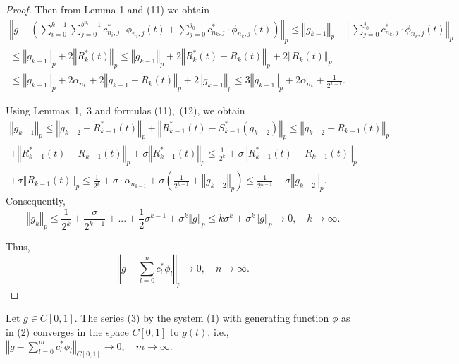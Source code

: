 \documentclass[
11pt,%
tightenlines,%
twoside,%
onecolumn,%
nofloats,%
nobibnotes,%
nofootinbib,%
superscriptaddress,%
noshowpacs,%
centertags]%
{revtex4}
\begin{document}
\begin{proof}
Then from Lemma 1 and (11) we obtain
\begin{multline*}
    \left\Vert  g- \left(  \sum_{i=0}^{k-1} \sum_{j=0}^{b^{n_i}-1}
    c_{n_i,j}^{\ast} \cdot \phi_{n_i,j}(t) + \sum_{j=0}^{j_0}
    c_{n_k,j}^{\ast} \cdot \phi_{n_k,j}(t)   \right)  \right\Vert_p
    \le \left\Vert  g_{k-1} \right\Vert_p +\left\Vert \sum_{j=0}^{j_0}
    c_{n_k,j}^{\ast} \cdot \phi_{n_k,j}(t) \right\Vert_p
    \\
    \le\left\Vert  g_{k-1} \right\Vert_p + 2 \left\Vert  R_k^{\ast}
    (t) \right\Vert_p \le \left\Vert  g_{k-1} \right\Vert_p + 2
    \left\Vert  R_k^{\ast} (t) - R_k (t) \right\Vert_p + 2 \left\Vert
    R_k (t) \right\Vert_p
    \\
    \le\left\Vert  g_{k-1} \right\Vert_p + 2\alpha_{n_k} +  2
    \left\Vert g_{k-1} - R_k (t) \right\Vert_p  + 2\left\Vert  g_{k-1}
    \right\Vert_p \le 3\left\Vert  g_{k-1} \right\Vert_p
    +2\alpha_{n_k}+ \frac{1}{2^{k+1}}  .
\end{multline*}

Using Lemmas~1,~3 and formulas (11),~(12), we obtain
\begin{multline*}
    \left\Vert  g_{k-1} \right\Vert_p \le \left\Vert  g_{k-2}  -
    R_{k-1}^{\ast} (t) \right\Vert_p + \left\Vert     R_{k-1}^{\ast}
    (t)- S_{k-1}^{\ast} (g_{k-2}) \right\Vert_p \le \left\Vert g_{k-2}
    - R_{k-1} (t) \right\Vert_p
    \\
    +\left\Vert  R_{k-1}^{\ast} (t) - R_{k-1} (t) \right\Vert_p +
    \sigma \left\Vert  R_{k-1}^{\ast} (t)
    \right\Vert_p \le
    \frac{1}{2^k} + \sigma \left\Vert  R_{k-1}^{\ast} (t) -  R_{k-1}
    (t) \right\Vert_p
    \\
    +\sigma \left\Vert  R_{k-1} (t) \right\Vert_p \le \frac{1}{2^k} +
    \sigma\cdot \alpha_{n_{k-1}}+ \sigma \left( \frac{1}{2^{k+1}}  +
    \left\Vert  g_{k-2} \right\Vert_p \right) \le \frac{1}{2^{k-1}} +
    \sigma \left\Vert  g_{k-2} \right\Vert_p .
\end{multline*}
Consequently,
$$
\left\Vert  g_{k} \right\Vert_p  \le \frac{1}{2^{k}}   + \frac{\sigma}{2^{k-1}}+ ...+
\frac{1}{2} \sigma^{k-1}+  \sigma^{k}\left\Vert  g \right\Vert_p \le
k\sigma^{k}+ \sigma^{k}\left\Vert  g \right\Vert_p \to 0, \quad k\to \infty.
$$

Thus,
$$
\left\Vert  g - \sum_{l=0}^{n}   c_l^{\ast}  \phi_l\right\Vert_p
\to 0, \quad n\to \infty.
$$
\end{proof}
\begin{theorem} %
    Let $ g \in C[0,1] $. The series (3) by
    the system (1) with generating function $ \phi $ as in (2)
    converges in the  space  $  C[0,1]$ to $ g(t) $, i.e., $
    \left\Vert g- \sum_{l=0}^{m}  c^{\ast}_l  \phi_l
    \right\Vert_{C[0,1]} \to 0,\quad m\to \infty$.
\end{theorem}
\end{document}
